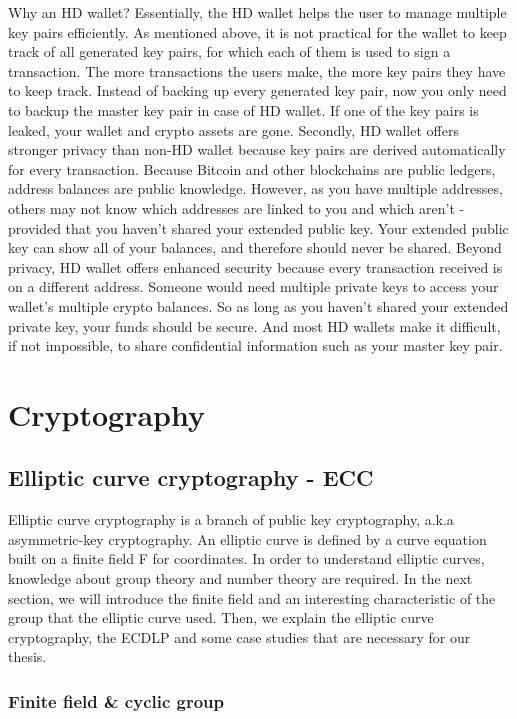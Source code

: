 Why an HD wallet? Essentially, the HD wallet helps the user to manage multiple key pairs efficiently. As mentioned above, it is not practical for the wallet to keep track of all generated key pairs, for which each of them is used to sign a transaction. The more transactions the users make, the more key pairs they have to keep track. Instead of backing up every generated key pair, now you only need to backup the master key pair in case of HD wallet. If one of the key pairs is leaked, your wallet and crypto assets are gone. Secondly,  HD wallet offers stronger privacy than non-HD wallet because key pairs are derived automatically for every transaction. Because Bitcoin and other blockchains are public ledgers, address balances are public knowledge. However, as you have multiple addresses, others may not know which addresses are linked to you and which aren’t - provided that you haven’t shared your extended public key. Your extended public key can show all of your balances, and therefore should never be shared. Beyond privacy, HD wallet offers enhanced security because every transaction received is on a different address. Someone would need multiple private keys to access your wallet’s multiple crypto balances. So as long as you haven’t shared your extended private key, your funds should be secure. And most HD wallets make it difficult, if not impossible, to share confidential information such as your master key pair.

\section{Cryptography}
\label{cryptography}

\subsection{Elliptic curve cryptography - ECC}

Elliptic curve cryptography is a branch of public key cryptography, a.k.a asymmetric-key cryptography. An elliptic curve is defined by a curve equation built on a finite field F for coordinates. In order to understand elliptic curves, knowledge about group theory and number theory are required. In the next section, we will introduce the finite field and an interesting characteristic of the group that the elliptic curve used. Then, we explain the elliptic curve cryptography, the ECDLP and some case studies that are necessary for our thesis.

\subsubsection{Finite field \& cyclic group}

